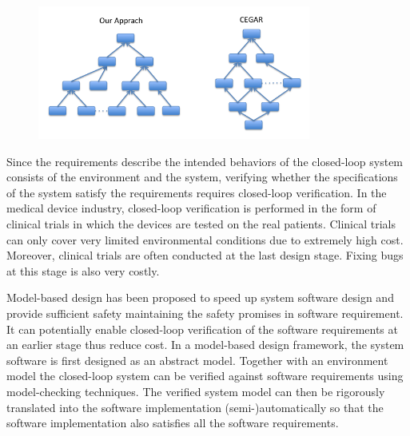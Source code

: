 \begin{figure}[!t]
		\centering
		\includegraphics[width=0.8\textwidth]{figs/env_sys.png}
		\caption{\small }
		\label{fig:distinction}
\end{figure}

Since the requirements describe the intended behaviors of the closed-loop system consists of the environment and the system, verifying whether the specifications of the system satisfy the requirements requires closed-loop verification. In the medical device industry, closed-loop verification is performed in the form of clinical trials in which the devices are tested on the real patients. Clinical trials can only cover very limited environmental conditions due to extremely high cost. Moreover, clinical trials are often conducted at the last design stage. Fixing bugs at this stage is also very costly.

Model-based design has been proposed to speed up system software design and provide sufficient safety maintaining the safety promises in software requirement. It can potentially enable closed-loop verification of the software requirements at an earlier stage thus reduce cost. In a model-based design framework, the system software is first designed as an abstract model. Together with an environment model the closed-loop system can be verified against software requirements using model-checking techniques. The verified system model can then be rigorously translated into the software implementation (semi-)automatically so that the software implementation also satisfies all the software requirements.


